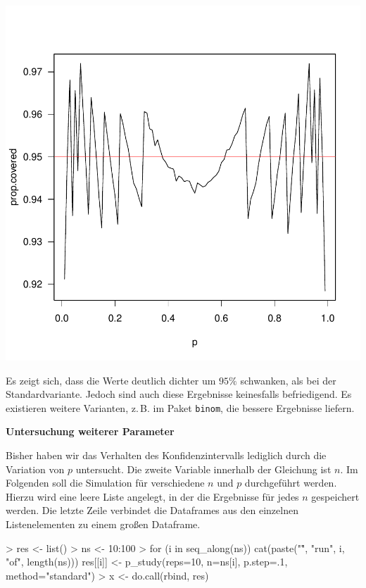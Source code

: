 \includegraphics{sim_binomial_prop-020}

Es zeigt sich, dass die Werte deutlich dichter um $95\%$ schwanken, als bei der Standardvariante. Jedoch sind auch diese Ergebnisse keinesfalls befriedigend. Es existieren weitere Varianten, z.\,B. im Paket \texttt{binom}, die bessere Ergebnisse liefern.


\textbf{Untersuchung weiterer Parameter} 

Bisher haben wir das Verhalten des Konfidenzintervalls lediglich durch die Variation von $p$ untersucht. Die zweite Variable innerhalb der Gleichung ist $n$. Im Folgenden soll die Simulation für verschiedene $n$ und $p$ durchgeführt werden. Hierzu wird eine leere Liste angelegt, in der die Ergebnisse für jedes $n$ gespeichert werden. Die letzte Zeile verbindet die Dataframes aus den einzelnen Listenelementen zu einem großen Dataframe.

\begin{Schunk}
\begin{Sinput}
> res <- list()
> ns <- 10:100
> for (i in seq_along(ns)){
   cat(paste("\r", "run", i, "of", length(ns)))
   res[[i]] <- p_study(reps=10, n=ns[i], p.step=.1, 
                       method="standard")
 } 
> x <- do.call(rbind, res)
\end{Sinput}
\end{Schunk}

